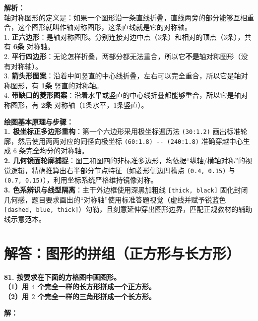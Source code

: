 \vspace{0.8cm}

{\small\color{gray}
\textbf{解析：}\\
轴对称图形的定义是：如果一个图形沿一条直线折叠，直线两旁的部分能够互相重合，这个图形就叫作轴对称图形，这条直线就是它的对称轴。\\
1. \textbf{正六边形}：是轴对称图形。分别连接对边中点（3条）和相对的顶点（3条），共有 \textbf{6条} 对称轴。\\
2. \textbf{平行四边形}：无论怎样折叠，两部分都无法重合，所以它\textbf{不是}轴对称图形（没有对称轴）。\\
3. \textbf{箭头形图案}：沿着中间竖直的中心线折叠，左右可以完全重合，所以它是轴对称图形，有 \textbf{1条} 竖直的对称轴。\\
4. \textbf{带缺口的菱形图案}：沿着水平或竖直的中心线折叠都能够重合，所以它是轴对称图形，有 \textbf{2条} 对称轴（1条水平，1条竖直）。
}

\vspace{0.6cm}

{\small\color{blue!70!black}
\textbf{绘图基本原理与步骤：}\\
\textbf{1. 极坐标正多边形重构}：第一个六边形采用极坐标遍历法 \texttt{(30:1.2)} 画出标准轮廓，然后使用两两对应的同径向极坐标 \texttt{(60:1.8) -{}- (240:1.8)} 准确穿越中心生成 6 条完全均分的对称轴。\\
\textbf{2. 几何镜面轮廓捕捉}：图三和图四的非标准多边形，均依据“纵轴/横轴对称”的视觉逻辑，精确推算出右半部分节点特征（如菱形侧边凹槽点 \texttt{(0.4, 0.15)} 与 \texttt{(0.7, 0.15)}），利用坐标系统严格维持镜像对称。\\
\textbf{3. 色系辨识与线型隔离}：主干外边框使用深黑加粗线 \texttt{[thick, black]} 固化封闭几何感，题目要求画出的“对称轴”使用标准答题视觉（虚线并赋予锐蓝色 \texttt{[dashed, blue, thick]}）勾勒，且刻意延伸穿出图形边界，匹配正规教材的辅助线示意范本。
}


\section{解答：图形的拼组（正方形与长方形）}

\vspace{0.6cm}

\textbf{\LARGE 81.} \textbf{按要求在下面的方格图中画图形。\\[1ex]
（1）用 $4$ 个完全一样的长方形拼成一个正方形。\\[1ex]
（2）用 $2$ 个完全一样的三角形拼成一个长方形。}

\vspace{0.4cm}
\textbf{解：}

